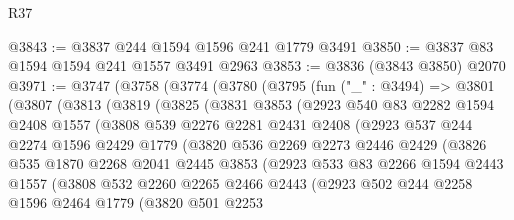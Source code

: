 \begin{lexlean}{R37}
\begin{coremodule}
@3843 := @3837 @244 @1594 @1596 @241 @1779 @3491
@3850 := @3837 @83 @1594 @1594 @241 @1557 @3491 @2963
@3853 := @3836 (@3843 @3850) @2070
@3971 := @3747
    (@3758
      (@3774
        (@3780
          (@3795
            (fun ("_" : @3494) =>
            @3801
              (@3807
                (@3813
                  (@3819
                    (@3825
                      (@3831
                        @3853
                        (@2923
                          @540
                          @83
                          @2282
                          @1594
                          @2408
                          @1557
                          (@3808
                            @539
                            @2276
                            @2281
                            @2431
                            @2408
                            (@2923
                              @537
                              @244
                              @2274
                              @1596
                              @2429
                              @1779
                              (@3820
                                @536
                                @2269
                                @2273
                                @2446
                                @2429
                                (@3826
                                  @535
                                  @1870
                                  @2268
                                  @2041
                                  @2445
                                  @3853
                                  (@2923
                                    @533
                                    @83
                                    @2266
                                    @1594
                                    @2443
                                    @1557
                                    (@3808
                                      @532
                                      @2260
                                      @2265
                                      @2466
                                      @2443
                                      (@2923
                                        @502
                                        @244
                                        @2258
                                        @1596
                                        @2464
                                        @1779
                                        (@3820
                                          @501
                                          @2253

\end{coremodule}
\end{lexlean}
